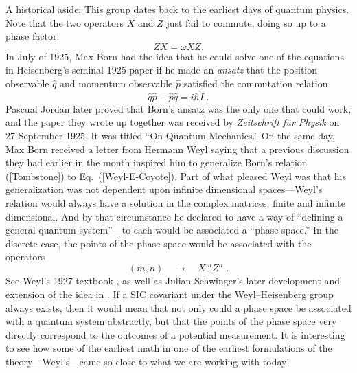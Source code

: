 \documentclass[aps,pra,superscriptaddress,12pt,tightenlines,nofootinbib]{revtex4-2}
\begin{document}
A historical aside:  This group dates back to the earliest days of
quantum physics.  Note that the two operators $X$ and $Z$ just fail to
commute, doing so up to a phase factor:
\begin{equation}
ZX = \omega XZ.
\label{Weyl-E-Coyote}
\end{equation}
In July of 1925, Max Born had the idea that he could solve one of the equations in Heisenberg's seminal 1925 paper if he made an {\it ansatz\/} that the position observable $\hat{q}$ and momentum observable $\hat{p}$ satisfied the commutation relation \cite{Bernstein05,Fedak09}
\begin{equation}
\hat{q}\hat{p} - \hat{p}\hat{q}= i\hbar\hat{I}\;.
\label{Tombstone}
\end{equation}
Pascual Jordan later proved that Born's ansatz was the only one that could work, and the paper they wrote up together was received by {\sl Zeitschrift f\"ur Physik\/} on 27 September 1925.  It was titled ``On Quantum Mechanics.'' On the same day, Max Born received a letter from Hermann Weyl \cite{Scholz08} saying that a previous discussion they had earlier in the month inspired him to generalize Born's relation (\ref{Tombstone}) to Eq.~(\ref{Weyl-E-Coyote}).  Part of what pleased Weyl was that his generalization was not dependent upon infinite dimensional spaces---Weyl's relation would always have a solution in the complex matrices, finite and infinite dimensional.  And by that circumstance he declared to have a way of ``defining a general quantum system''---to each would be associated a ``phase space.''  In the discrete case, the points of the phase space would be associated with the operators
\begin{equation}
(m,n) \quad \longrightarrow \quad X^m Z^n\;.
\end{equation}
See Weyl's 1927 textbook \cite{Weyl27}, as well as Julian Schwinger's later
development and extension of the idea in \cite{Schwinger70}.  If a SIC
covariant under the Weyl--Heisenberg group always exists, then it
would mean that not only could a phase space be associated with a
quantum system abstractly, but that the points of the phase space very
directly correspond to the outcomes of a potential measurement.  It is
interesting to see how some of the earliest math in one of the
earliest formulations of the theory---Weyl's---came so close to what
we are working with today!
\end{document}
